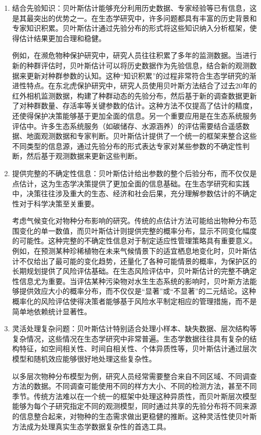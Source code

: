 \documentclass[
  twoside,12pt,fontset=none]{ctexbook}
\begin{document}
\begin{enumerate}
\def\labelenumi{\arabic{enumi}.}
\item
  结合先验知识：贝叶斯估计能够充分利用历史数据、专家经验等已有信息，这是其最突出的优势之一。在生态学研究中，许多问题都具有丰富的历史背景和专家知识积累。贝叶斯估计通过先验分布的形式将这些知识纳入分析框架，使得估计结果更加合理和稳健。

  例如，在濒危物种保护研究中，研究人员往往积累了多年的监测数据。当进行新的种群评估时，贝叶斯估计可以将历史数据作为先验信息，结合新的观测数据来更新对种群参数的认知。这种``知识积累''的过程非常符合生态学研究的渐进性特点。在东北虎保护研究中，研究人员使用贝叶斯方法结合了过去20年的红外相机监测数据，构建了种群动态的先验分布，然后基于新的调查数据更新了对种群数量、存活率等关键参数的估计。这种方法不仅提高了估计的精度，还使得保护决策能够基于更加全面的信息。另一个重要应用是在生态系统服务评估中。许多生态系统服务（如碳储存、水源涵养）的评估需要结合遥感数据、地面观测数据和专家判断。贝叶斯估计提供了一个统一的框架来整合这些不同类型的信息源，通过先验分布的形式表达专家对某些参数的不确定性判断，然后基于观测数据来更新这些判断。
\item
  提供完整的不确定性信息：贝叶斯估计给出参数的整个后验分布，而不仅仅是点估计，这为生态学决策提供了更加全面的信息基础。在生态学研究和实践中，决策往往涉及重大的生态、经济和社会后果，充分理解参数估计的不确定性对于科学决策至关重要。

  考虑气候变化对物种分布影响的研究。传统的点估计方法可能给出物种分布范围变化的单一数值，而贝叶斯估计则提供完整的概率分布，显示不同变化幅度的可能性。这种完整的不确定性信息对于制定适应性管理策略具有重要意义。例如，在预测某种珍稀植物在未来气候情景下的适宜栖息地变化时，贝叶斯估计不仅给出了最可能的变化趋势，还量化了各种可能情景的概率，为保护区的长期规划提供了风险评估基础。在生态风险评估中，贝叶斯估计的完整不确定性信息尤为重要。当评估某种污染物对水生生态系统的影响时，贝叶斯方法能够提供效应大小的概率分布，而不仅仅是``显著''或``不显著''的二元结论。这种概率化的风险评估使得决策者能够基于风险水平制定相应的管理措施，而不是简单地依赖统计显著性。
\item
  灵活处理复杂问题：贝叶斯估计特别适合处理小样本、缺失数据、层次结构等复杂情况，这些情况在生态学研究中非常普遍。生态学数据往往具有复杂的结构特征，如空间相关性、时间自相关性、个体异质性等，贝叶斯估计通过层次模型和随机效应能够很好地处理这些复杂性。

  以多层次物种分布模型为例，研究人员经常需要整合来自不同区域、不同调查方法的数据。不同调查可能使用不同的样方大小、不同的检测方法，甚至不同季节。传统方法难以在一个统一的框架中处理这种异质性，而贝叶斯层次模型能够为每个子研究指定不同的观测模型，同时通过共享的先验分布将不同来源的信息整合起来，对物种的生态需求做出更稳健的推断。这种灵活性使贝叶斯方法成为处理真实生态学数据复杂性的首选工具。
\end{enumerate}
\end{document}
